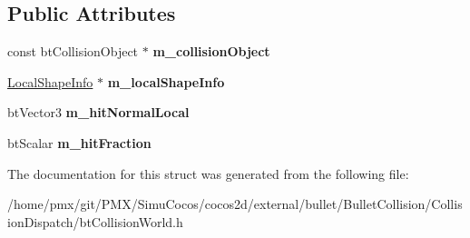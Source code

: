 \subsection*{Public Attributes}
\begin{DoxyCompactItemize}
\item 
\mbox{\label{structbtCollisionWorld_1_1LocalRayResult_a5da7ccc1b87c3bf1b562146b73d62cbf}} 
const bt\+Collision\+Object $\ast$ {\bfseries m\+\_\+collision\+Object}
\item 
\mbox{\label{structbtCollisionWorld_1_1LocalRayResult_a448c5d385bd65c37f0b6130b01367999}} 
\hyperlink{structbtCollisionWorld_1_1LocalShapeInfo}{Local\+Shape\+Info} $\ast$ {\bfseries m\+\_\+local\+Shape\+Info}
\item 
\mbox{\label{structbtCollisionWorld_1_1LocalRayResult_ad82b15c5fafbbef1d60c9c0c66774288}} 
bt\+Vector3 {\bfseries m\+\_\+hit\+Normal\+Local}
\item 
\mbox{\label{structbtCollisionWorld_1_1LocalRayResult_a7404aa8c0c9c12bb50898ddc2f86a6a1}} 
bt\+Scalar {\bfseries m\+\_\+hit\+Fraction}
\end{DoxyCompactItemize}


The documentation for this struct was generated from the following file\+:\begin{DoxyCompactItemize}
\item 
/home/pmx/git/\+P\+M\+X/\+Simu\+Cocos/cocos2d/external/bullet/\+Bullet\+Collision/\+Collision\+Dispatch/bt\+Collision\+World.\+h\end{DoxyCompactItemize}
